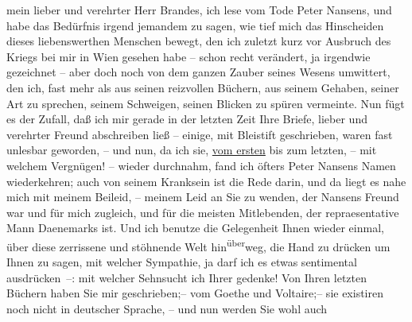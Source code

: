 \pstart{}mein lieber und verehrter Herr Brandes,\pend\vspace{0.5em}
\pstart
           ich lese vom Tode Peter Nansens, und habe das
               Bedürfnis irgend jemandem zu sagen, wie tief mich das Hinscheiden dieses
               liebenswerthen Menschen bewegt, den ich zuletzt kurz vor Ausbruch des Kriegs bei mir
               in Wien gesehen habe – schon recht verändert, ja
               irgendwie gezeichnet – aber doch noch von dem ganzen Zauber seines Wesens umwittert,
               den ich, fast mehr als aus seinen reizvollen Büchern, aus seinem Gehaben, seiner Art
               zu sprechen, seinem Schweigen, seinen Blicken zu spüren vermeinte. Nun fügt es der
               Zufall, daß ich mir gerade in der letzten Zeit Ihre Briefe, lieber und verehrter
               Freund abschreiben ließ – einige, mit Bleistift geschrieben, waren fast unlesbar
               geworden, – und nun, da ich sie, \uline{vom ersten} bis zum
               letzten,  – mit welchem Vergnügen! – wieder
               durchnahm, fand ich öfters Peter Nansens Namen
               wiederkehren; auch von seinem Kranksein ist die Rede darin, und da liegt es nahe mich
               mit meinem Beileid, – meinem Leid an Sie zu wenden, der Nansens Freund war und für mich zugleich, und für die meisten
               Mitlebenden, {\pb}der repraesentative Mann Daenemarks ist. Und ich benutze die Gelegenheit
               Ihnen wieder einmal, über diese zerrissene und stöhnende Welt hin\substVorne{}\textsuperscript{über}\substDazwischen{}weg\substHinten{}, die Hand zu drücken um Ihnen zu sagen, mit welcher Sympathie, ja darf ich
               es etwas sentimental ausdrücken –: mit welcher Sehnsucht ich Ihrer gedenke! Von Ihren
               letzten Büchern haben Sie mir geschrieben;– vom Goethe und Voltaire;– sie existiren noch nicht in deutscher Sprache, – und nun werden Sie wohl auch
